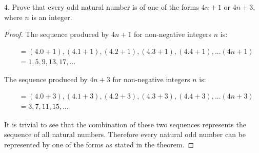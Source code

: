 \documentclass[a4paper,12pt]{article}
\begin{document}
4. Prove that every odd natural number is of one of the forms $4n + 1$ or $4n + 3$, where $n$ is an integer.

\begin{proof}

  The sequence produced by $4n + 1$ for non-negative integers $n$ is:

\begin{align*} 
  &= (4.0 + 1), (4.1 + 1), (4.2 + 1), (4.3 + 1), (4.4 + 1), ... (4n + 1) \\
  &= 1, 5, 9, 13, 17, ...
\end{align*} 

  The sequence produced by $4n + 3$ for non-negative integers $n$ is:

\begin{align*} 
  &= (4.0 + 3), (4.1 + 3), (4.2 + 3), (4.3 + 3), (4.4 + 3), ... (4n + 3) \\
  &= 3, 7, 11, 15, ...
\end{align*} 

It is trivial to see that the combination of these two sequences represents the
sequence of all natural numbers. Therefore every natural odd number can be
represented by one of the forms as stated in the theorem.

\end{proof}
\end{document}
